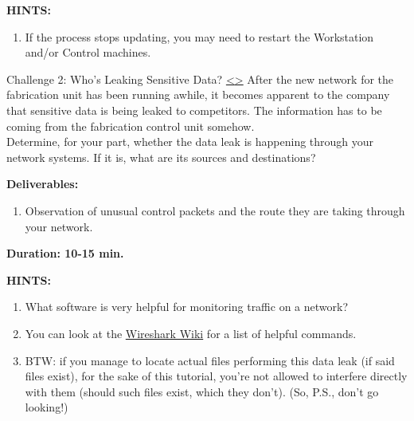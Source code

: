 \documentclass[12pt]{extarticle}
\newenvironment{instructionblock}{\Large\bgroup}{\egroup}
\newcommand{\ben}{\begin{enumerate}}
\newcommand{\een}{\end{enumerate}}
\begin{document}
\vspace{8mm}
\noindent
\textbf{HINTS:}
\begin{enumerate}
    \item If the process stops updating, you may need to restart the Workstation and/or Control machines.
\end{enumerate}








\pagebreak
\begin{slide}{ Challenge 2: Who's Leaking Sensitive Data? }{ \hyperref[slide 11]{\textless}\hyperref[slide 13]{\textgreater} }
\vskip 5pt
\begin{instructionblock}
    After the new network for the fabrication unit has been running awhile, it becomes apparent to the company that sensitive data is being leaked to competitors. The information has to be coming from the fabrication control unit somehow.\\
    
    Determine, for your part, whether the data leak is happening through your network systems. If it is, what are its sources and destinations?


	\textbf{\Large{Deliverables:}}
	\ben
		\item Observation of unusual control packets and the route they are taking through your network.
	\een

  \vspace{20mm}
  \begin{center}
  \textbf{\Large{Duration: 10-15 min.} }
  \end{center}

\end{instructionblock}
\end{slide}


\vspace{8mm}
\noindent
\textbf{HINTS:}
\begin{enumerate}
	\item What software is very helpful for monitoring traffic on a network?
	\item You can look at the \href{https://wiki.wireshark.org/CaptureFilters}{Wireshark Wiki} for a list of helpful commands.
	\item BTW: if you manage to locate actual files performing this data leak (if said files exist), for the sake of this tutorial, you're not allowed to interfere directly with them (should such files exist, which they don't). (So, P.S., don't go looking!)
\end{enumerate}
\end{document}
